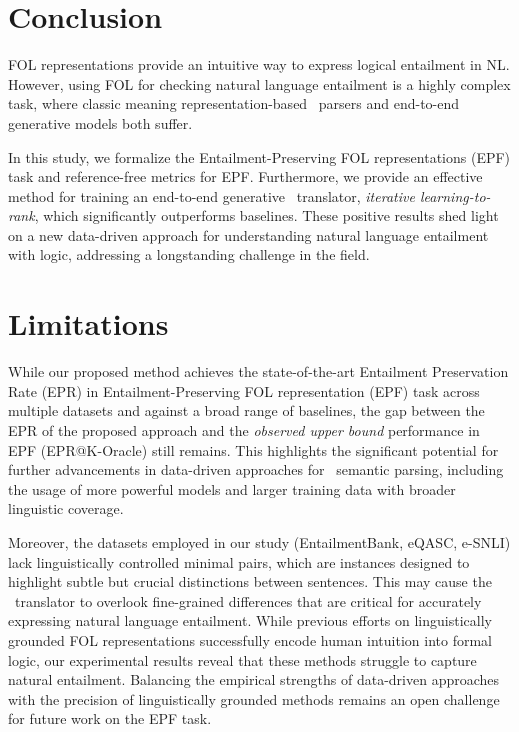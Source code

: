 \section{Conclusion}

FOL representations provide an intuitive way to express logical entailment in NL. However, using FOL for checking natural language entailment is a highly complex task, where classic meaning representation-based \nltofol\ parsers and end-to-end generative models both suffer.

In this study, we formalize the Entailment-Preserving FOL representations (EPF) task and reference-free metrics for EPF. Furthermore, we provide an effective method for training an end-to-end generative \nltofol\ translator, \textit{iterative learning-to-rank}, which significantly outperforms baselines. These positive results shed light on a new data-driven approach for understanding natural language entailment with logic, addressing a longstanding challenge in the field.


\section{Limitations}

While our proposed method achieves the state-of-the-art Entailment Preservation Rate (EPR) in Entailment-Preserving FOL representation (EPF) task across multiple datasets and against a broad range of baselines, the gap between the EPR of the proposed approach and the \textit{observed upper bound} performance in EPF (EPR@K-Oracle) still remains. This highlights the significant potential for further advancements in data-driven approaches for \nltofol\ semantic parsing, including the usage of more powerful models and larger training data with broader linguistic coverage.

Moreover, the datasets employed in our study (EntailmentBank, eQASC, e-SNLI) lack linguistically controlled minimal pairs, which are instances designed to highlight subtle but crucial distinctions between sentences. This may cause the \nltofol\ translator to overlook fine-grained differences that are critical for accurately expressing natural language entailment. While previous efforts on linguistically grounded FOL representations \citep{bos-nli, amr2fol} successfully encode human intuition into formal logic, our experimental results reveal that these methods struggle to capture natural entailment. Balancing the empirical strengths of data-driven approaches with the precision of linguistically grounded methods remains an open challenge for future work on the EPF task.